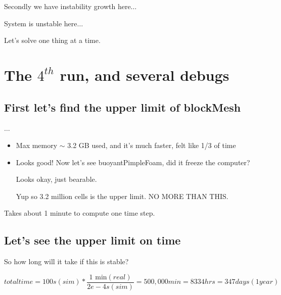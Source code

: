 \documentclass[12pt]{article}
\renewcommand{\_}{\kern-1.5pt\textunderscore\kern-1.5pt}
\begin{document}
Secondly we have instability growth here$ \ldots $ \par

\par

System is unstable here$ \ldots $ \par

Let’s solve one thing at a time.\par
\section{The $4^{th}$ run, and several debugs}

\subsection{First let's find the upper limit of blockMesh}$ \ldots $ \par

\begin{itemize}
	\item Max memory $ \sim $  3.2 GB used, and it’s much faster, felt like 1/3 of time\par

	\item Looks good! Now let’s see buoyantPimpleFoam, did it freeze the computer?\par

\par

Looks okay, just bearable.\par

Yup so 3.2 million cells is the upper limit. NO MORE THAN THIS.\par

\end{itemize}

Takes about 1 minute to compute one time step.\par

\subsection{Let's see the upper limit on time}
So how long will it take if this is stable?\par

 \[ total time=100s \left( sim \right) \ast\frac{\text{1 min} \left( real \right) }{2e-4s  \left( sim \right) }=500,000min=8334 hrs=347 days  \left( 1 year \right)  \] \par
\end{document}

